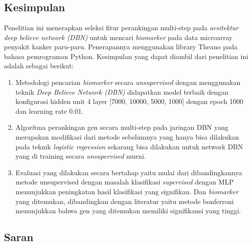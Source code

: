 \chapter{\kesimpulan}
	

\section{Kesimpulan}
Penelitian ini menerapkan seleksi fitur perankingan multi-step pada \textit{arsitektur deep believe network (DBN)} untuk mencari \textit{biomarker} pada data microarray penyakit kanker paru-paru. Penerapannya menggunakan library Theano pada bahasa pemrograman Python. Kesimpulan yang dapat diambil dari penelitian ini adalah sebagai berikut:
\begin{enumerate}
\item Metodologi pencarian \textit{biomarker} secara \textit{unsupervised} dengan menggunakan teknik \textit{Deep Believe Network (DBN)} didapatkan model terbaik  dengan konfigurasi hidden unit 4 layer [7000, 10000, 5000, 1000] dengan epoch 1000 dan learning rate 0.01.
\item Algoritma perankingan gen secara multi-step pada jaringan DBN yang merupakan modifikasi dari metode sebelumnya yang hanya bisa dilakukan pada teknik \textit{logistic regression} sekarang bisa dilakukan untuk network DBN yang di training secara \textit{unsupervised} murni.
\item Evaluasi yang dilakukan secara bertahap yaitu mulai dari dibandingkannya metode unsupervised dengan masalah klasifikasi \textit{supervised} dengan MLP menunjukkan peningkatan hasil klasifikasi yang signifikan. Dan \textit{biomarker} yang ditemukan, dibandingkan dengan literatur yaitu metode bonferroni menunjukkan bahwa gen yang ditemukan memiliki signifikansi yang tinggi.
\end{enumerate}




\section{Saran}

